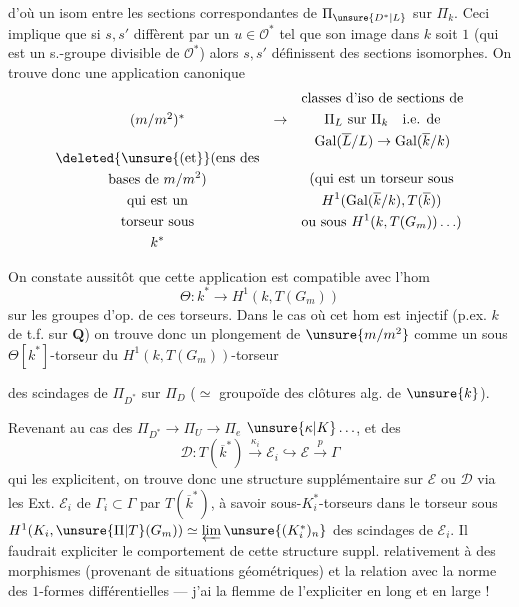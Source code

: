 d'où un isom entre les sections correspondantes de $\Pi_{\unsure{D^*|L}}$ sur $\Pi_k$.
Ceci implique que si $s,s'$ diffèrent par un $u\in\mathcal{O}^*$ tel que son image dans $k$ soit $1$   (qui est un s.-groupe divisible de $\mathcal{O}^*$\unsure{]|)}) alors $s,s'$ définissent des sections isomorphes.
On trouve donc une application canonique
\[
\begin{array}{ccl}
(m/m^2)^* & \to &
\begin{gathered}
\text{classes d'iso de sections de}\\
\Pi_L\text{ sur }\Pi_k\quad\text{i.e. de}\\
\operatorname{Gal}(\overline{L}/L)\to\operatorname{Gal}(\overline{k}/k)
\end{gathered}
\\[1ex]
\begin{gathered}
\deleted{\unsure{\text{(et}}}\text{(ens des}\\
\text{bases de }m/m^2\text{)}\\
\text{qui est un}\\
\text{torseur sous}\\ k^*
\end{gathered}
&&
\begin{gathered}
\text{(qui est un torseur sous}\\
H^1(\operatorname{Gal}(\overline{k}/k),T(\overline{k}))\\
\text{ou sous }H^1(k,T(G_m))\ldots)
\end{gathered}
\end{array}
\]

On constate aussitôt que cette application est compatible avec l'hom
\[
\Theta:k^*\to H^1(k,T(G_m))
\]
sur les groupes d'op. de ces torseurs.
Dans le cas où cet hom est injectif (p.ex. $k$  de t.f. sur $\mathbf{Q}$) on trouve donc un plongement de $\unsure{m/m^2}$ comme un sous $\Theta[k^*]$-torseur du $H^1(k,T(G_m))$-torseur


des scindages de $\Pi_{D^*}$  sur $\Pi_D$ ($\simeq$ groupoïde des clôtures alg. de $\unsure{k}$).

Revenant au cas des  $\Pi_{D^*}\to\Pi_U\to\Pi_e$ $\unsure{\kappa|K}\ldots$, et des 
\[
\mathcal{D}:T(\overline{k}^*)\xrightarrow{\kappa_i}\mathcal{E}_i\hookrightarrow\mathcal{E}\xrightarrow{p}\Gamma
\]
qui les explicitent, on trouve donc une structure supplémentaire sur $\mathcal{E}$ ou $\mathcal{D}$ via  les Ext. $\mathcal{E}_i$ de $\Gamma_i\subset\Gamma$ par $T(\overline{k}^*)$, à savoir   sous-$K_i^*$-torseurs dans le torseur sous
$H^1(K_i,\unsure{\Pi|T}(G_m))\simeq\varprojlim\unsure{(K_i^*)_n}$ des  scindages de $\mathcal{E}_i$.
Il faudrait expliciter le comportement de cette structure suppl. relativement à des morphismes (provenant de situations géométriques) et la relation avec la norme des $1$-formes différentielles --- j'ai la flemme de l'expliciter en long et en large !


